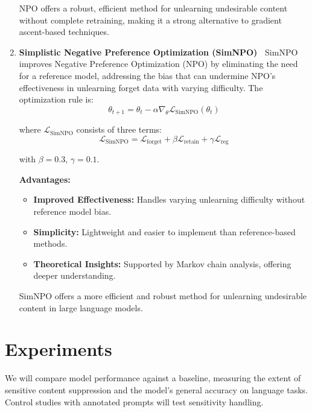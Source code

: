 \documentclass[11pt]{article}
\begin{document}
\begin{enumerate}
NPO offers a robust, efficient method for unlearning undesirable content without complete retraining, making it a strong alternative to gradient ascent-based techniques.


\item \textbf{Simplistic Negative Preference Optimization (SimNPO)~\cite{fan2024simplicity} }
SimNPO improves Negative Preference Optimization (NPO) by eliminating the need for a reference model, addressing the bias that can undermine NPO’s effectiveness in unlearning forget data with varying difficulty. The optimization rule is:
\vspace{-3pt}
\[
\theta_{t+1} = \theta_t - \alpha \nabla_{\theta} \mathcal{L}_{\text{SimNPO}}(\theta_t)
\]

where $\mathcal{L}_{\text{SimNPO}}$ consists of three terms:
\vspace{-3pt}
\[
\mathcal{L}_{\text{SimNPO}} = \mathcal{L}_{\text{forget}} + \beta \mathcal{L}_{\text{retain}} + \gamma \mathcal{L}_{\text{reg}}
\]

with $\beta = 0.3$, $\gamma = 0.1$.  

\textbf{Advantages:}
\begin{itemize}
    \item \textbf{Improved Effectiveness:} Handles varying unlearning difficulty without reference model bias.
    \item \textbf{Simplicity:} Lightweight and easier to implement than reference-based methods.
    \item \textbf{Theoretical Insights:} Supported by Markov chain analysis, offering deeper understanding.
\end{itemize}

SimNPO offers a more efficient and robust method for unlearning undesirable content in large language models.



    \end{enumerate}


    \section{Experiments}
    We will compare model performance against a baseline, measuring the extent of sensitive content suppression and the model's general accuracy on language tasks. Control studies with annotated prompts will test sensitivity handling.
\end{document}
